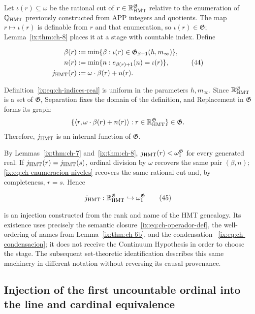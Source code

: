Let \(\iota(r)\subseteq\omega\) be the rational cut of
\(r\in\mathbb R_{\rm HMT}^{\mathfrak G}\) relative to the enumeration of
\(\mathbb Q_{\rm HMT}\) previously constructed from APP integers and
quotients. The map \(r\mapsto\iota(r)\) is definable from \(r\) and that
enumeration, so \(\iota(r)\in\mathfrak G\); Lemma~\ref{ix:thm:ch-8} places it at
a stage with countable index. Define

\[
 \begin{aligned}
  \beta(r)&:=\min\{\beta:
       \iota(r)\in\mathfrak G_{\beta+1}(h,m_\infty)\},\\
  n(r)&:=\min\{n:e_{\beta(r)+1}(n)=\iota(r)\},\\
  j_{\rm HMT}(r)&:=\omega\cdot\beta(r)+n(r).
 \end{aligned}
\tag{44}\label{ix:eq:ch-indices-real}
\]

Definition~\eqref{ix:eq:ch-indices-real} is uniform in the parameters
\(h,m_\infty\). Since \(\mathbb R_{\rm HMT}^{\mathfrak G}\) is a set of
\(\mathfrak G\), Separation fixes the domain of the definition, and
Replacement in \(\mathfrak G\) forms its graph:
\[
 \{\langle r,\omega\cdot\beta(r)+n(r)\rangle:
 r\in\mathbb R_{\rm HMT}^{\mathfrak G}\}\in\mathfrak G.
\]
Therefore, \(j_{\rm HMT}\) is an internal function of \(\mathfrak G\).

By Lemmas~\ref{ix:thm:ch-7} and~\ref{ix:thm:ch-8},
\(j_{\rm HMT}(r)<\omega_1^{\mathfrak G}\) for every generated real. If
\(j_{\rm HMT}(r)=j_{\rm HMT}(s)\), ordinal division by \(\omega\) recovers the
same pair \((\beta,n)\); \eqref{ix:eq:ch-enumeracion-niveles} recovers the same
rational cut and, by completeness, \(r=s\). Hence

\[
 j_{\rm HMT}:\mathbb R_{\rm HMT}^{\mathfrak G}
 \hookrightarrow\omega_1^{\mathfrak G}
\tag{45}\label{ix:eq:ch-inyeccion-j}
\]

is an injection constructed from the rank and name of the HMT genealogy. Its
existence uses precisely the semantic closure~\eqref{ix:eq:ch-operador-def}, the
well-ordering of names from Lemma~\ref{ix:thm:ch-6b}, and the condensation
~\eqref{ix:eq:ch-condensacion}; it does not receive the Continuum Hypothesis in
order to choose the stage. The subsequent set-theoretic identification
describes this same machinery in different notation without reversing its
causal provenance.

\subsection{Injection of the first uncountable ordinal into the line and cardinal equivalence}

